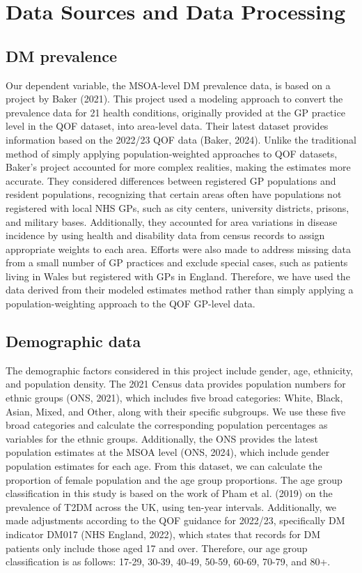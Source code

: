 \section{Data Sources and Data Processing}
\label{sec:3.2}
\subsection{DM prevalence}
\label{sec:3.2.1}
Our dependent variable, the MSOA-level DM prevalence data, is based on a project by Baker (2021). This project used a modeling approach to convert the prevalence data for 21 health conditions, originally provided at the GP practice level in the QOF dataset, into area-level data. Their latest dataset provides information based on the 2022/23 QOF data (Baker, 2024). Unlike the traditional method of simply applying population-weighted approaches to QOF datasets, Baker’s project accounted for more complex realities, making the estimates more accurate. They considered differences between registered GP populations and resident populations, recognizing that certain areas often have populations not registered with local NHS GPs, such as city centers, university districts, prisons, and military bases. Additionally, they accounted for area variations in disease incidence by using health and disability data from census records to assign appropriate weights to each area. Efforts were also made to address missing data from a small number of GP practices and exclude special cases, such as patients living in Wales but registered with GPs in England. Therefore, we have used the data derived from their modeled estimates method rather than simply applying a population-weighting approach to the QOF GP-level data.

\subsection{Demographic data}
\label{sec:3.2.2}
The demographic factors considered in this project include gender, age, ethnicity, and population density. The 2021 Census data provides population numbers for ethnic groups (ONS, 2021), which includes five broad categories: White, Black, Asian, Mixed, and Other, along with their specific subgroups. We use these five broad categories and calculate the corresponding population percentages as variables for the ethnic groups. Additionally, the ONS provides the latest population estimates at the MSOA level (ONS, 2024), which include gender population estimates for each age. From this dataset, we can calculate the proportion of female population and the age group proportions. The age group classification in this study is based on the work of Pham et al. (2019) on the prevalence of T2DM across the UK, using ten-year intervals. Additionally, we made adjustments according to the QOF guidance for 2022/23, specifically DM indicator DM017 (NHS England, 2022), which states that records for DM patients only include those aged 17 and over. Therefore, our age group classification is as follows: 17-29, 30-39, 40-49, 50-59, 60-69, 70-79, and 80+.


